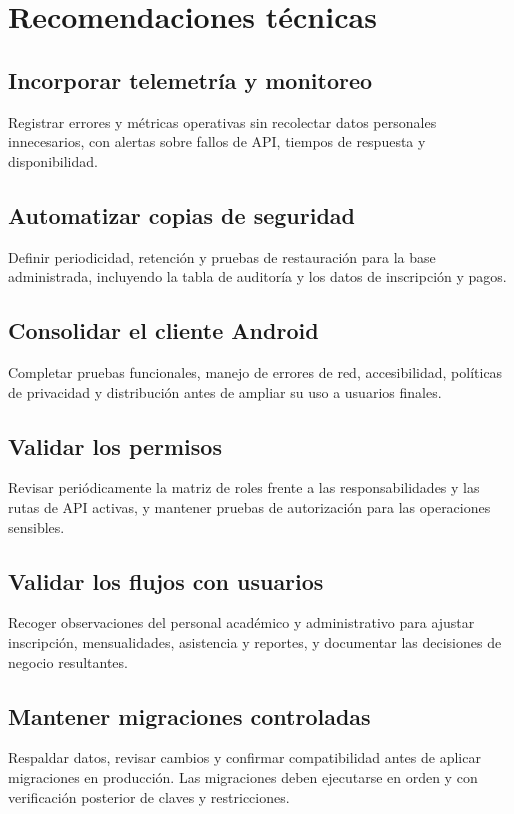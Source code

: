 \documentclass[12pt,a4paper,oneside]{report}
\begin{document}
\section{Recomendaciones técnicas}

\subsection{Incorporar telemetría y monitoreo}
Registrar errores y métricas operativas sin recolectar datos personales innecesarios, con alertas sobre fallos de API, tiempos de respuesta y disponibilidad.

\subsection{Automatizar copias de seguridad}
Definir periodicidad, retención y pruebas de restauración para la base administrada, incluyendo la tabla de auditoría y los datos de inscripción y pagos.

\subsection{Consolidar el cliente Android}
Completar pruebas funcionales, manejo de errores de red, accesibilidad, políticas de privacidad y distribución antes de ampliar su uso a usuarios finales.

\subsection{Validar los permisos}
Revisar periódicamente la matriz de roles frente a las responsabilidades y las rutas de API activas, y mantener pruebas de autorización para las operaciones sensibles.

\subsection{Validar los flujos con usuarios}
Recoger observaciones del personal académico y administrativo para ajustar inscripción, mensualidades, asistencia y reportes, y documentar las decisiones de negocio resultantes.

\subsection{Mantener migraciones controladas}
Respaldar datos, revisar cambios y confirmar compatibilidad antes de aplicar migraciones en producción. Las migraciones deben ejecutarse en orden y con verificación posterior de claves y restricciones.
\end{document}
